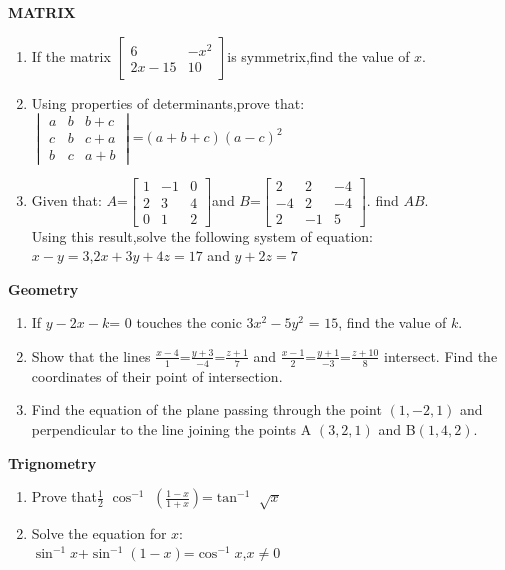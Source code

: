\documentclass[12pt,-letter paper]{article}
\providecommand{\myvec}[1]{\ensuremath{\begin{bmatrix}#1\end{bmatrix}}}
\providecommand{\brak}[1]{\ensuremath{\left(#1\right)}}
\begin{document}
                                
\begin{center}                                                               
\textbf{MATRIX} 
\end{center} 
\begin{enumerate}
	\item If the matrix \(\myvec{6 & -x^2 \\ 2x-15 & 10}\)is symmetrix,find the value of $x$.
	\item Using properties of determinants,prove that: \\
		$\begin{vmatrix} a & b & b+c \\ c & b & c+a \\ b& c & a+b \end{vmatrix}$=\brak{a+b+c}$\brak{a-c}^2$
		\item Given that: $A$=\(\myvec{1 & -1 & 0 \\ 2 & 3 & 4 \\ 0 & 1 & 2}\)and $B$=\(\myvec{2 & 2 & -4 \\ -4 & 2 & -4 \\ 2 & -1 & 5}\). find $AB$. \\
			Using this result,solve the following system of equation: \\
			$ x-y=3 $,$2x+3y+4z=17$ and $y+2z=7$
\end{enumerate}
\begin{center}                                                               
\textbf{Geometry}
\end{center}
    \begin{enumerate}     
	    \item If $ y-2x-k $= $0 $ touches the conic $ 3x^2-5y^2$ = $15$, find the value of $k$.  
             \item Show that the lines $\frac{x-4}{1}$=$\frac{y+3}{-4}$=$\frac{z+1}{7}$ and $\frac{x-1}{2}$=$\frac{y+1}{-3}$=$\frac{z+10}{8}$ intersect. Find the coordinates of their point of intersection.
     \item Find the equation of the plane passing through the point  \brak{1,-2, 1} and perpendicular to the line joining the points A \brak{3, 2, 1} and B\brak{1, 4, 2}.                                                   
\end{enumerate} 
\begin{center}
	\textbf{Trignometry}
\end{center}
\begin{enumerate}
	\item Prove that$\frac{1}{2}$ $\cos^{-1}$ \brak{\frac{1-x}{1+x}}=$\tan^{-1}$ $\sqrt{x}$ 	
	\item Solve the equation for $x$: \\
		$\sin^{-1}$$x$+$\sin^{-1}$$\brak{1-x}$=$\cos^{-1}$$x$,$x\neq 0$
\end{enumerate}
\end{document}
